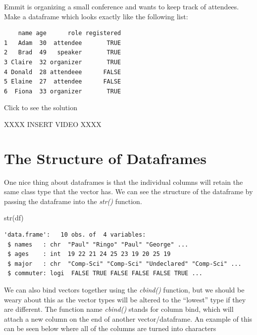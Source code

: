 \documentclass[
  letterpaper,
  DIV=11,
  numbers=noendperiod]{scrreprt}
\newenvironment{Shaded}{\begin{snugshade}}{\end{snugshade}}
\newcommand{\FunctionTok}[1]{\textcolor[rgb]{0.28,0.35,0.67}{#1}}
\newcommand{\NormalTok}[1]{\textcolor[rgb]{0.00,0.23,0.31}{#1}}
\begin{document}
\begin{tcolorbox}[enhanced jigsaw, colframe=quarto-callout-tip-color-frame, colback=white, breakable, rightrule=.15mm, title=\textcolor{quarto-callout-tip-color}{\faLightbulb}\hspace{0.5em}{Try it Out}, bottomtitle=1mm, toptitle=1mm, titlerule=0mm, left=2mm, coltitle=black, colbacktitle=quarto-callout-tip-color!10!white, leftrule=.75mm, opacitybacktitle=0.6, bottomrule=.15mm, opacityback=0, arc=.35mm, toprule=.15mm]

Emmit is organizing a small conference and wants to keep track of
attendees. Make a dataframe which looks exactly like the following list:

\begin{verbatim}
    name age      role registered
1   Adam  30  attendee       TRUE
2   Brad  49   speaker       TRUE
3 Claire  32 organizer       TRUE
4 Donald  28 attendeee      FALSE
5 Elaine  27  attendee      FALSE
6  Fiona  33 organizer       TRUE
\end{verbatim}

Click to see the solution

XXXX INSERT VIDEO XXXX

\end{tcolorbox}

\section{The Structure of Dataframes}\label{the-structure-of-dataframes}

One nice thing about dataframes is that the individual columns will
retain the same class type that the vector has. We can see the structure
of the dataframe by passing the dataframe into the \emph{str()}
function.

\begin{Shaded}
\begin{Highlighting}[]
\FunctionTok{str}\NormalTok{(df)}
\end{Highlighting}
\end{Shaded}

\begin{verbatim}
'data.frame':   10 obs. of  4 variables:
 $ names   : chr  "Paul" "Ringo" "Paul" "George" ...
 $ ages    : int  19 22 21 24 25 23 19 20 25 19
 $ major   : chr  "Comp-Sci" "Comp-Sci" "Undeclared" "Comp-Sci" ...
 $ commuter: logi  FALSE TRUE FALSE FALSE FALSE TRUE ...
\end{verbatim}

We can also bind vectors together using the \emph{cbind()} function, but
we should be weary about this as the vector types will be altered to the
``lowest'' type if they are different. The function name \emph{cbind()}
stands for column bind, which will attach a new column on the end of
another vector/dataframe. An example of this can be seen below where all
of the columns are turned into characters
\end{document}
